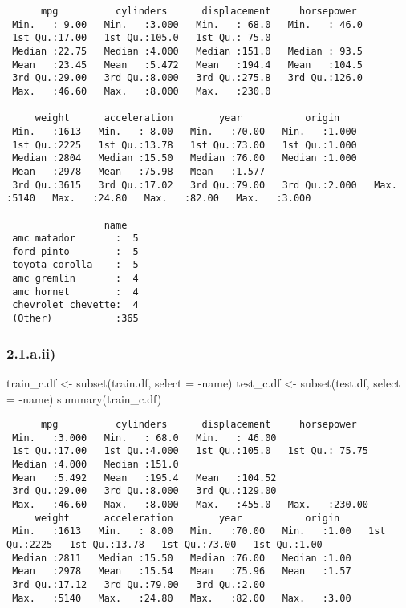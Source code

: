 \documentclass[
]{article}
\newenvironment{Shaded}{\begin{snugshade}}{\end{snugshade}}
\newcommand{\AttributeTok}[1]{\textcolor[rgb]{0.77,0.63,0.00}{#1}}
\newcommand{\FunctionTok}[1]{\textcolor[rgb]{0.00,0.00,0.00}{#1}}
\newcommand{\NormalTok}[1]{#1}
\newcommand{\OtherTok}[1]{\textcolor[rgb]{0.56,0.35,0.01}{#1}}
\newcommand{\SpecialCharTok}[1]{\textcolor[rgb]{0.00,0.00,0.00}{#1}}
\begin{document}
\begin{verbatim}
      mpg          cylinders      displacement     horsepower   
 Min.   : 9.00   Min.   :3.000   Min.   : 68.0   Min.   : 46.0  
 1st Qu.:17.00   1st Qu.:105.0   1st Qu.: 75.0  
 Median :22.75   Median :4.000   Median :151.0   Median : 93.5  
 Mean   :23.45   Mean   :5.472   Mean   :194.4   Mean   :104.5  
 3rd Qu.:29.00   3rd Qu.:8.000   3rd Qu.:275.8   3rd Qu.:126.0  
 Max.   :46.60   Max.   :8.000   Max.   :230.0  
                                                                
     weight      acceleration        year           origin     
 Min.   :1613   Min.   : 8.00   Min.   :70.00   Min.   :1.000  
 1st Qu.:2225   1st Qu.:13.78   1st Qu.:73.00   1st Qu.:1.000  
 Median :2804   Median :15.50   Median :76.00   Median :1.000  
 Mean   :2978   Mean   :75.98   Mean   :1.577  
 3rd Qu.:3615   3rd Qu.:17.02   3rd Qu.:79.00   3rd Qu.:2.000   Max.   :5140   Max.   :24.80   Max.   :82.00   Max.   :3.000  
                                                               
                 name    
 amc matador       :  5  
 ford pinto        :  5  
 toyota corolla    :  5  
 amc gremlin       :  4  
 amc hornet        :  4  
 chevrolet chevette:  4  
 (Other)           :365  
\end{verbatim}

\hypertarget{a.ii}{%
\subsubsection{2.1.a.ii)}\label{a.ii}}

\begin{Shaded}
\begin{Highlighting}[]


\NormalTok{train\_c.df }\OtherTok{\textless{}{-}} \FunctionTok{subset}\NormalTok{(train.df, }\AttributeTok{select =} \SpecialCharTok{{-}}\NormalTok{name)}
\NormalTok{test\_c.df }\OtherTok{\textless{}{-}} \FunctionTok{subset}\NormalTok{(test.df, }\AttributeTok{select =} \SpecialCharTok{{-}}\NormalTok{name)}
\FunctionTok{summary}\NormalTok{(train\_c.df)}
\end{Highlighting}
\end{Shaded}

\begin{verbatim}
      mpg          cylinders      displacement     horsepower    
 Min.   :3.000   Min.   : 68.0   Min.   : 46.00  
 1st Qu.:17.00   1st Qu.:4.000   1st Qu.:105.0   1st Qu.: 75.75  
 Median :4.000   Median :151.0  
 Mean   :5.492   Mean   :195.4   Mean   :104.52  
 3rd Qu.:29.00   3rd Qu.:8.000   3rd Qu.:129.00  
 Max.   :46.60   Max.   :8.000   Max.   :455.0   Max.   :230.00  
     weight      acceleration        year           origin    
 Min.   :1613   Min.   : 8.00   Min.   :70.00   Min.   :1.00   1st Qu.:2225   1st Qu.:13.78   1st Qu.:73.00   1st Qu.:1.00  
 Median :2811   Median :15.50   Median :76.00   Median :1.00  
 Mean   :2978   Mean   :15.54   Mean   :75.96   Mean   :1.57  
 3rd Qu.:17.12   3rd Qu.:79.00   3rd Qu.:2.00  
 Max.   :5140   Max.   :24.80   Max.   :82.00   Max.   :3.00  
\end{verbatim}
\end{document}
